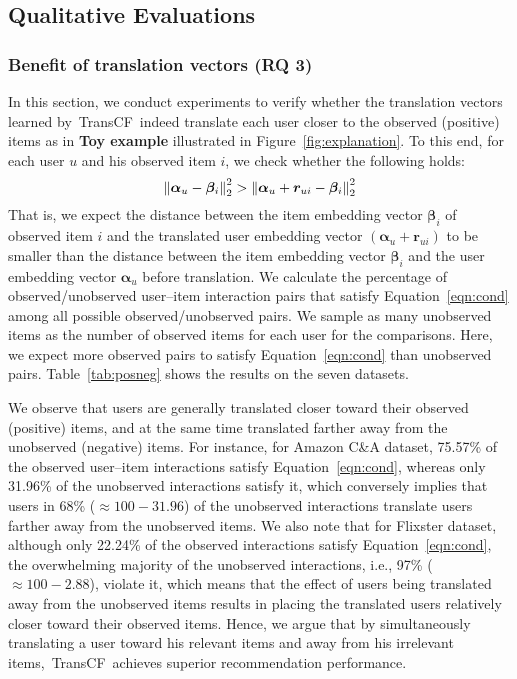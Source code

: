 \documentclass[conference]{IEEEtran}
\newcommand{\norm}[1]{\left\lVert#1\right\rVert}
\newcommand{\propose}{\textsf{{TransCF}}}
\begin{document}
\subsection{Qualitative Evaluations}
\vspace{-0.5ex}
\label{exp:qual}
\subsubsection{\textbf{Benefit of translation vectors (RQ 3)}} 
In this section, we conduct experiments to verify whether the translation vectors learned by~\propose~indeed translate each user closer to the observed (positive) items as in \textbf{Toy example} illustrated in Figure~\ref{fig:explanation}.
To this end, for each user $u$ and his observed item $i$, we check whether the following holds: 
\begin{equation}
	\small
	\label{eqn:cond}
	\norm{\bm{\alpha}_u-\bm{\beta}_i}^2_2 > \norm{\bm{\alpha}_u+\bm{r}_{ui}-\bm{\beta}_i}^2_2
\end{equation}
That is, we expect the distance between the item embedding vector $\bm{\beta}_i$ of observed item $i$ and the translated user embedding vector $(\bm{\alpha}_u + \bm{r}_{ui})$ to be smaller than the distance between the item embedding vector $\bm{\beta}_i$ and the user embedding vector $\bm{\alpha}_u$ before translation.
We calculate the percentage of observed/unobserved
user--item interaction pairs that satisfy Equation~\ref{eqn:cond} among all possible observed/unobserved pairs. 
We sample as many unobserved items as the number of observed items for each user for the comparisons. 
Here, we expect more observed pairs to satisfy Equation~\ref{eqn:cond} than unobserved pairs.
Table~\ref{tab:posneg} shows the results on the seven datasets. 

We observe that users are generally translated closer toward their observed (positive) items, and at the same time translated farther away from the unobserved (negative) items. For instance, for Amazon C\&A dataset, 75.57\% of the observed user--item interactions satisfy Equation~\ref{eqn:cond}, whereas only 31.96\% of the unobserved interactions satisfy it, which conversely implies that users in 68\% ($\approx 100-31.96$) of the unobserved interactions translate users farther away from the unobserved items. We also note that for Flixster dataset, although only 22.24\% of the observed interactions satisfy Equation~\ref{eqn:cond}, the overwhelming majority of the unobserved interactions, i.e., 97\% ($\approx 100-2.88$), violate it, which means that the effect of users being translated away from the unobserved items results in placing the translated users relatively closer toward their observed items.
Hence, we argue that by simultaneously translating a user toward his relevant items and away from his irrelevant items,~\propose~achieves superior recommendation performance.
\end{document}
